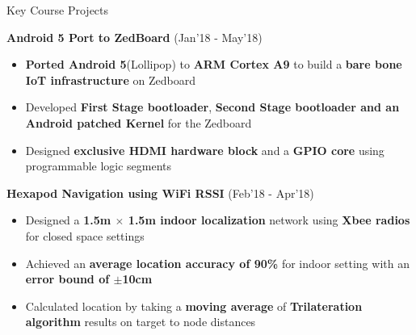 \documentclass{resume}
\newcommand{\sepval}{-0.5em}
\begin{document}
\begin{rSection}{Key Course Projects}

\vspace{-.4cm}

\item {\bf Android 5 Port to ZedBoard} \hfill {(Jan'18 - May'18)}\\
[-0.4cm]

\begin{itemize}[leftmargin=*]

	\itemsep \sepval

	\item {\bf Ported Android 5}(Lollipop) to {\bf ARM Cortex A9} to build a {\bf bare bone IoT infrastructure} on Zedboard
	
	\item Developed {\bf First Stage bootloader}, {\bf Second Stage
		bootloader and an Android patched Kernel} for the Zedboard
	
	\item Designed {\bf exclusive HDMI hardware block} and a {\bf GPIO core} using programmable logic segments
	
\end{itemize}

\vspace{-0.1cm}
\item {\bf Hexapod Navigation using WiFi RSSI}  \hfill{(Feb'18 - Apr'18)}\\
[-0.4cm]

\begin{itemize}[leftmargin=*]

	\itemsep \sepval

	\item Designed a {\bf 1.5m $\times$ 1.5m indoor localization} network using {\bf Xbee radios} for closed space settings
	     
	\item Achieved an {\bf average location accuracy of 90\%} for indoor setting with an {\bf error bound of $\pm$10cm}
	
	\item Calculated location by taking a {\bf moving average} of {\bf Trilateration algorithm} results on target to node distances




\end{itemize}
\end{rSection}
\end{document}
